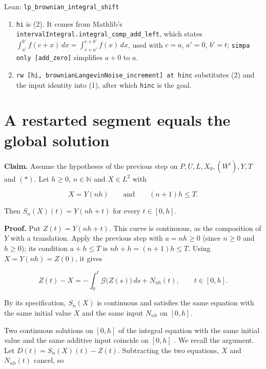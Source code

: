 \documentclass[11pt,a4paper]{article}
\begin{document}
\begin{leanbox}{Lean: \texttt{lp\_\allowbreak{}brownian\_\allowbreak{}integral\_\allowbreak{}shift}}
\begin{enumerate}
\item \texttt{hi} is (2). It comes from Mathlib's \texttt{interval\allowbreak{}Integral.\allowbreak{}integral\_\allowbreak{}comp\_\allowbreak{}add\_\allowbreak{}left}, which states \(\int_{a'}^{b'}f(c+x)\,dx=\int_{c+a'}^{c+b'}f(x)\,dx\), used with \(c=a\), \(a'=0\), \(b'=t\); \texttt{simpa only [add\_\allowbreak{}zero]} simplifies \(a+0\) to \(a\).

\item \texttt{rw [hi, brownian\allowbreak{}Langevin\allowbreak{}Noise\_\allowbreak{}increment] at hinc} substitutes (2) and the input identity into (1), after which \texttt{hinc} is the goal.

\end{enumerate}
\end{leanbox}

\section{\texorpdfstring{A restarted segment equals the global solution}{A restarted segment equals the global solution}}


\textbf{Claim.} Assume the hypotheses of the previous step on \(P,U,L,X_0,(W^i),Y,T\) and \((\ast)\). Let \(h\ge0\), \(n\in\mathbb N\) and \(X\in L^2\) with


\[X=Y(nh)\qquad\text{and}\qquad(n+1)h\le T.\]


Then \(S_n(X)(t)=Y(nh+t)\) for every \(t\in[0,h]\).




\textbf{Proof.} Put \(Z(t)=Y(nh+t)\). This curve is continuous, as the composition of \(Y\) with a translation. Apply the previous step with \(a=nh\ge0\) (since \(n\ge0\) and \(h\ge0\)); its condition \(a+h\le T\) is \(nh+h=(n+1)h\le T\). Using \(X=Y(nh)=Z(0)\), it gives


\[Z(t)-X=-\int_0^t\mathcal G\bigl(Z(s)\bigr)\,ds+N_{nh}(t),\qquad t\in[0,h].\]


By its specification, \(S_n(X)\) is continuous and satisfies the same equation with the same initial value \(X\) and the same input \(N_{nh}\) on \([0,h]\).




Two continuous solutions on \([0,h]\) of the integral equation with the same initial value and the same additive input coincide on \([0,h]\) \cite[Section~3.43.4]{LangevinLean2026ULASC}. We recall the argument. Let \(D(t)=S_n(X)(t)-Z(t)\). Subtracting the two equations, \(X\) and \(N_{nh}(t)\) cancel, so
\end{document}
